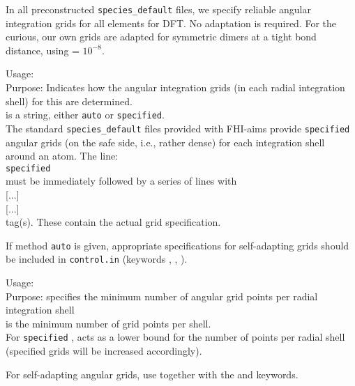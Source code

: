 In all
preconstructed \texttt{species\_default} files, we specify reliable
angular integration grids for all elements for DFT. No adaptation
is required. For the curious, our own grids are adapted for symmetric
dimers at a tight bond distance, using  = $10^{-8}$.

{
  \noindent
  Usage:  
    \\[1.0ex]
  Purpose: Indicates how the angular integration grids (in each radial
    integration shell) for this  are
    determined. \\[1.0ex]
   is a string, either \texttt{auto} or
    \texttt{specified}. \\
}
The standard \texttt{species\_default} files provided with FHI-aims
provide \texttt{specified} angular grids (on the safe side, i.e.,
rather dense) for each  integration shell
around an atom. The line: \\[1.0ex]
 \texttt{specified} \\[1.0ex]
must be immediately followed by a series of lines with \\[1.0ex]
     [...] \\
     [...] \\[1.0ex]
tag(s). These contain the actual grid specification. 

If method \texttt{auto} is given, appropriate specifications for
self-adapting grids should be included in \texttt{control.in} (keywords 
, , 
).

{
  \noindent
  Usage:   \\[1.0ex]
  Purpose: specifies the minimum number of angular grid points per
    radial integration shell \\[1.0ex]
   is the minimum number of grid points per shell. \\
}
For \texttt{specified} , acts as a
lower bound for the number of points per radial shell (specified grids
will be increased accordingly). 

For self-adapting angular grids, use together with the
 and 
keywords. 

